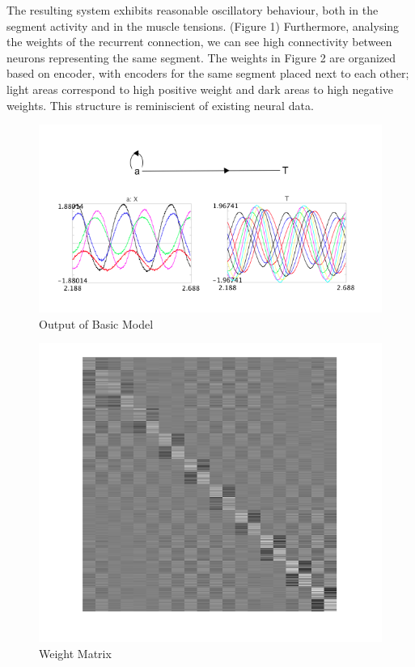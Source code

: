 \documentclass[12pt]{article}
\begin{document}
The resulting system exhibits reasonable oscillatory behaviour, both in the segment activity and in the muscle tensions. (Figure 1) Furthermore, analysing the weights of the recurrent connection, we can see high connectivity between neurons representing the same segment. The weights in Figure 2 are organized based on encoder, with encoders for the same segment placed next to each other; light areas correspond to high positive weight and dark areas to high negative weights. This structure is reminiscient of existing neural data. \cite{Elias}

    \begin{figure}[h!]
      \centering
      \includegraphics[scale=0.5]{neural.png}
      \caption{Output of Basic Model}
    \end{figure}

    \begin{figure}[h!]
      \centering
      \includegraphics[scale=0.5]{fig1.png}
      \caption{Weight Matrix}
    \end{figure}
\end{document}
